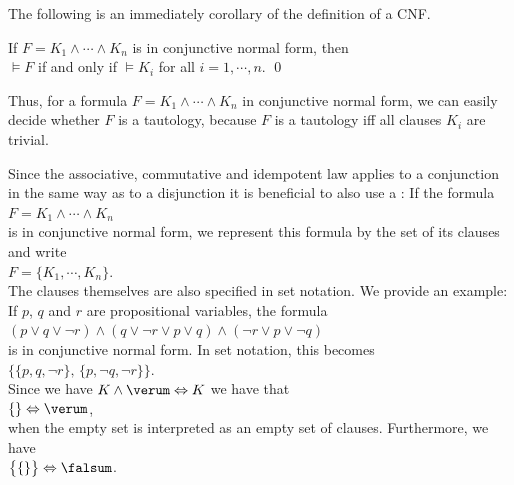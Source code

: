 \noindent
The following is an immediately corollary of the definition of a CNF.
\begin{Corollary} \label{corollary:knf}
  If $F = K_1 \wedge \cdots \wedge K_n$ is in conjunctive normal form, then\\[0.2cm]
  \hspace*{1.3cm} $\models F$ \quad if and only if \quad $\models K_i$ \quad for all $i=1,\cdots,n$. \qed
\end{Corollary}

Thus, for a formula $F = K_1 \wedge \cdots \wedge K_n$ in conjunctive normal form, we can easily decide whether
$F$ is a tautology, because $F$ is a tautology iff all clauses $K_i$ are trivial.
\vspace*{0.2cm}

Since the associative, commutative and idempotent law applies to a conjunction in the same way as to a
disjunction it is beneficial to also use a
:  If the formula
\\[0.2cm]
\hspace*{1.3cm}
$F = K_1 \wedge \cdots \wedge K_n$
\\[0.2cm]
is in conjunctive normal form, we represent this formula
by the set of its clauses and write \\[0.2cm]
\hspace*{1.3cm} 
$F = \{ K_1, \cdots, K_n \}$. 
\\[0.2cm]
The clauses themselves are also specified in set notation.
We provide an example: If $p$, $q$ and $r$ are propositional variables, the formula 
\\[0.2cm]
\hspace*{1.3cm}
$(p \vee q \vee \neg r) \wedge (q \vee \neg r \vee p \vee q)\wedge (\neg r \vee p \vee \neg q)$
\\[0.2cm]
is in conjunctive normal form.  In set notation, this becomes
\\[0.2cm]
\hspace*{1.3cm}
$\bigl\{ \{p, q, \neg r \},\, \{ p, \neg q, \neg r \} \bigr\}$.
\\[0.2cm]
Since we have $K \wedge \verum \Leftrightarrow K$ we have that
\\[0.2cm]
\hspace*{1.3cm}
$\{\} \Leftrightarrow \verum$,
\\[0.2cm]
when the empty set is interpreted as an empty set of clauses.  Furthermore, we have
\\[0.2cm]
\hspace*{1.3cm}
$\bigl\{ \{\} \bigr\} \Leftrightarrow \falsum$.

